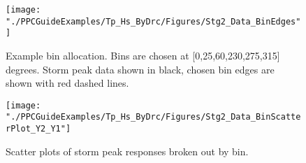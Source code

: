 \begin{figure}
	\centering
	\texttt{[image: "./PPCGuideExamples/Tp\_Hs\_ByDrc/Figures/Stg2\_Data\_BinEdges"]}
	\caption{Example bin allocation. Bins are chosen at [0,25,60,230,275,315] degrees. Storm peak data shown in black, chosen bin edges are shown with red dashed lines.}
	\label{fig:Stg2_Data_BinEdges}
\end{figure}

\begin{figure}
	\centering
	\texttt{[image: "./PPCGuideExamples/Tp\_Hs\_ByDrc/Figures/Stg2\_Data\_BinScatterPlot\_Y2\_Y1"]}
	\caption{ Scatter plots of storm peak responses broken out by bin.}
	\label{fig:Stg2_Data_BinScatterPlot_Y2_Y1}
\end{figure}


